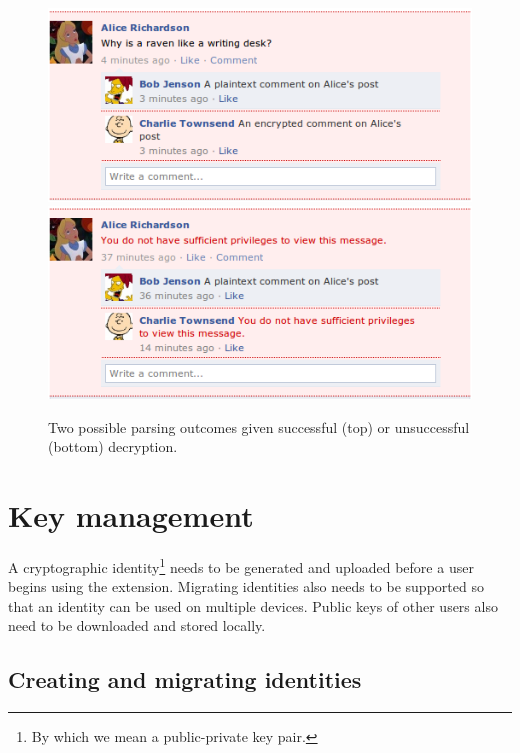     \begin{figure}[tbph]
        \begin{center}
        
                \includegraphics[width=12cm]{screens/content2.png}
                \includegraphics[width=12cm]{screens/content3.png}

            \caption{Two possible parsing outcomes given successful (top) or unsuccessful (bottom) decryption.}
            \label{scn:ctrl2}
        \end{center}
    \end{figure}
        

\FloatBarrier
\section{Key management}

A cryptographic identity\footnote{By which we mean a public-private key pair.} needs to be generated and uploaded before a user begins using the extension. Migrating identities also needs to be supported so that an identity can be used on multiple devices. Public keys of other users also need to be downloaded and stored locally.


\subsection{Creating and migrating identities}

